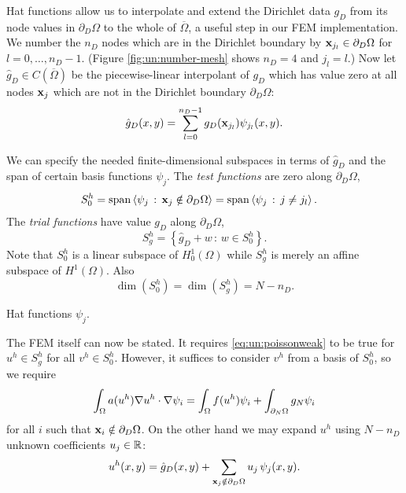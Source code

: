 Hat functions allow us to interpolate and extend the Dirichlet data $g_D$ from its node values in $\partial_D \Omega$ to the whole of $\overline\Omega$, a useful step in our FEM implementation.  We number the $n_D$ nodes which are in the Dirichlet boundary by $\mathbf{x}_{j_l} \in \partial_D\Omega$ for $l=0,\dots,n_D-1$.  (Figure \ref{fig:un:number-mesh} shows $n_D=4$ and $j_l=l$.)  Now let $\hat g_D \in C(\overline\Omega)$ be the piecewise-linear interpolant of $g_D$ which has value zero at all nodes $\mathbf{x}_j$ which are not in the Dirichlet boundary $\partial_D \Omega$:
\begin{equation}
\hat g_D(x,y) = \sum_{l=0}^{n_D-1} g_D(\mathbf{x}_{j_l}) \psi_{j_l}(x,y). \label{eq:un:hatgdefine}
\end{equation}

We can specify the needed finite-dimensional subspaces in terms of $\hat g_D$ and the span of certain basis functions $\psi_j$.  The \emph{test functions} are zero along $\partial_D \Omega$,
\begin{align*}
S_{0}^h &= \operatorname{span}\left<\psi_j \,:\, \mathbf{x}_j \notin \partial_D \Omega\right> = \operatorname{span}\left<\psi_j \,:\, j \neq j_l\right>.
\end{align*}
The \emph{trial functions} have value $g_D$ along $\partial_D \Omega$,
\begin{equation}
S_{g}^h = \left\{\hat g_D + w \,:\, w \in S_{0}^h\right\}.
\end{equation}
Note that $S_{0}^h$ is a linear subspace of $H_{0}^1(\Omega)$ while $S_{g}^h$ is merely an affine subspace of $H^1(\Omega)$.  Also
\begin{equation}
\dim(S_{0}^h)=\dim(S_{g}^h)=N-n_D.
\end{equation}

\begin{marginfigure}

\caption{Hat functions $\psi_j$.}
\label{fig:un:hatfunction}
\end{marginfigure}

The FEM itself can now be stated.  It requires \eqref{eq:un:poissonweak} to be true for $u^h\in S_{g}^h$ for all $v^h\in S_{0}^h$.  However, it suffices to consider $v^h$ from a basis of $S_{0}^h$, so we require
\begin{equation}
\int_\Omega a(u^h) \nabla u^h \cdot \nabla \psi_i = \int_\Omega f(u^h) \psi_i + \int_{\partial_N\Omega} g_N \psi_i \label{eq:un:weakformhat}
\end{equation}
for all $i$ such that $\mathbf{x}_i \notin \partial_D \Omega$.  On the other hand we may expand $u^h$ using $N-n_D$ unknown coefficients $u_j\in\mathbb{R}$:
\begin{equation}
u^h(x,y) = \hat g_D(x,y) + \sum_{\mathbf{x}_j \notin \partial_D \Omega} u_j\, \psi_j(x,y). \label{eq:un:uhexpand}
\end{equation}

